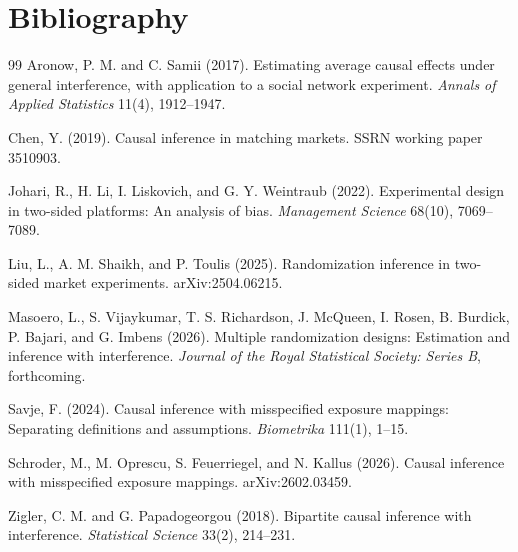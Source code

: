 \documentclass[11pt]{article}
\theoremstyle{definition}
\theoremstyle{plain}
\theoremstyle{remark}
\begin{document}
\section*{Bibliography}
\begin{thebibliography}{99}
Aronow, P. M. and C. Samii (2017).
Estimating average causal effects under general interference, with application to a social network experiment.
\emph{Annals of Applied Statistics} 11(4), 1912--1947.

Chen, Y. (2019).
Causal inference in matching markets.
SSRN working paper 3510903.

Johari, R., H. Li, I. Liskovich, and G. Y. Weintraub (2022).
Experimental design in two-sided platforms: An analysis of bias.
\emph{Management Science} 68(10), 7069--7089.

Liu, L., A. M. Shaikh, and P. Toulis (2025).
Randomization inference in two-sided market experiments.
arXiv:2504.06215.

Masoero, L., S. Vijaykumar, T. S. Richardson, J. McQueen, I. Rosen, B. Burdick, P. Bajari, and G. Imbens (2026).
Multiple randomization designs: Estimation and inference with interference.
\emph{Journal of the Royal Statistical Society: Series B}, forthcoming.

Savje, F. (2024).
Causal inference with misspecified exposure mappings: Separating definitions and assumptions.
\emph{Biometrika} 111(1), 1--15.

Schroder, M., M. Oprescu, S. Feuerriegel, and N. Kallus (2026).
Causal inference with misspecified exposure mappings.
arXiv:2602.03459.

Zigler, C. M. and G. Papadogeorgou (2018).
Bipartite causal inference with interference.
\emph{Statistical Science} 33(2), 214--231.
\end{thebibliography}
\end{document}
